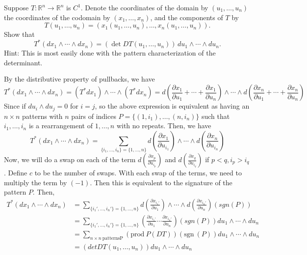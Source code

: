 \documentclass[11pt,letterpaper,cm]{nupset}
\begin{document}
\begin{problem}[Exercise 1] Suppose $T: \mathbb{R}^n \to \mathbb{R}^n$ is $C^1$. Denote the coordinates of the domain by $(u_1,\ldots,u_n)$ the coordinates of the codomain by $(x_1,\ldots,x_n)$, and the components of $T$ by
	$$T(u_1,\ldots,u_n) = (x_1(u_1,\ldots,u_n),\ldots,x_n(u_1,\ldots,u_n)).$$
	Show that
	$$T^\ast(dx_1\wedge \cdots \wedge dx_n) = (\det DT(u_1,\ldots,u_n))\,du_1\wedge \cdots \wedge du_n.$$
	Hint: This is most easily done with the pattern characterization of the determinant.
\end{problem}
\begin{solution}
	By the distributive property of pullbacks, we have
	$$T^\ast(dx_1\wedge \cdots \wedge dx_n)=(T^\ast dx_1)\wedge\cdots\wedge(T^\ast dx_n)=d(\frac{\partial x_1}{\partial u_1}+\cdots+\frac{\partial x_1}{\partial u_n})\wedge\cdots\wedge d(\frac{\partial x_n}{\partial u_1}+\cdots+\frac{\partial x_n}{\partial u_n})$$
	Since if $du_i\wedge du_j=0$ for $i=j$, so the above expression is equivalent as having an $n\times n$ patterns with $n$ pairs of indices $P=\{(1,i_1),\ldots,(n,i_n)\}$ such that $i_1,\ldots,i_n$ is a rearrangement of $1,\ldots,n$ with no repeats. Then, we have
	$$T^\ast(dx_1\wedge \cdots \wedge dx_n)=\sum_{\{i_1,\ldots,i_n\}=\{1,\ldots,n\}} d(\frac{\partial x_1}{\partial u_{i_1}})\wedge\cdots\wedge d(\frac{\partial x_n}{\partial u_{i_n}})$$
	Now, we will do a swap on each of the term $d(\frac{\partial x_p}{\partial u_{i_p}})$ and $d(\frac{\partial x_q}{\partial u_{i_q}})$ if $p<q,i_p>i_q$. Define $c$ to be the number of swaps. With each swap of the terms, we need to multiply the term by $(-1)$. Then this is equivalent to the signature of the pattern $P$. Then,
	\begin{align*}
		T^\ast(dx_1\wedge \cdots \wedge dx_n)&=\sum_{\{i_1',\ldots,i_n'\}=\{1,\ldots,n\}} d(\frac{\partial x_{i_1'}}{\partial u_{1}})\wedge\cdots\wedge d(\frac{\partial x_{i_n'}}{\partial u_n})(sgn(P))\\
		&=\sum_{\{i_1',\ldots,i_n'\}=\{1,\ldots,n\}} (\frac{\partial x_{i_1'}}{\partial u_{1}}\cdots\frac{\partial x_{i_n'}}{\partial u_n})(sgn(P))du_1\wedge\cdots\wedge du_n\\
		&=\sum_{n\times n\ \mathrm{ patterns P}} (\mathrm{prod}\ P(DT))(\mathrm{sgn}\ (P))du_1\wedge\cdots\wedge du_n\\
		&=(det DT(u_1,\ldots,u_n))du_1\wedge\cdots\wedge du_n
	\end{align*}

\end{solution}
\newpage
\end{document}
